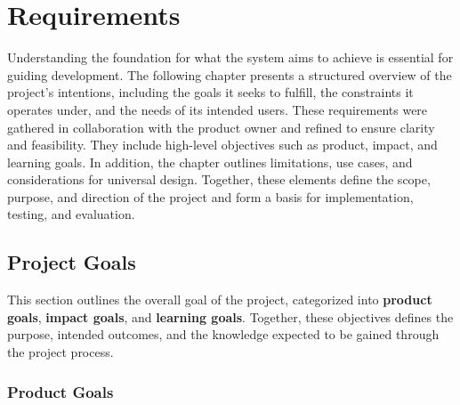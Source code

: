 \chapter{Requirements}\label{chap:requirements}

Understanding the foundation for what the system aims to achieve is essential for guiding development. The following chapter presents a structured overview of the project's intentions, including the goals it seeks to fulfill, the constraints it operates under, and the needs of its intended users. These requirements were gathered in collaboration with the product owner and refined to ensure clarity and feasibility. They include high-level objectives such as product, impact, and learning goals. In addition, the chapter outlines limitations, use cases, and considerations for universal design. Together, these elements define the scope, purpose, and direction of the project and form a basis for implementation, testing, and evaluation.

\section{Project Goals}

This section outlines the overall goal of the project, categorized into \textbf{product goals}, \textbf{impact goals}, and \textbf{learning goals}. Together, these objectives defines the purpose, intended outcomes, and the knowledge expected to be gained through the project process.
\subsection{Product Goals}\label{subsec:req:productgoals}

